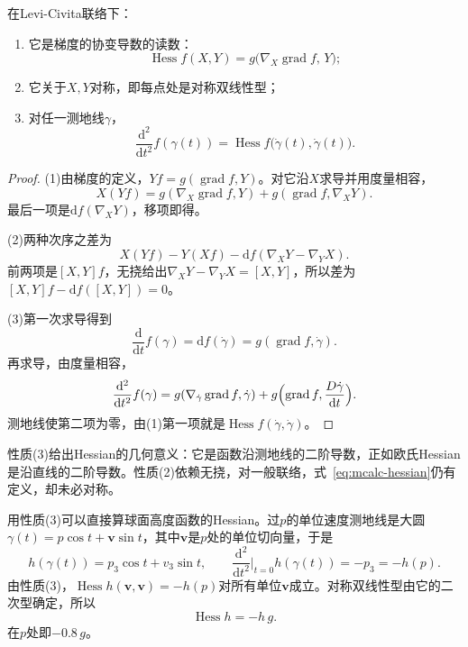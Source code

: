 \begin{theorem}[Hessian的性质]
\label{thm:mcalc-hessian-properties}
在Levi-Civita联络下：
\begin{enumerate}
\item 它是梯度的协变导数的读数：
\begin{equation}
\operatorname{Hess}f(X,Y)=g\bigl(\nabla_X\operatorname{grad}f,\,Y\bigr);
\label{eq:mcalc-hessian-grad}
\end{equation}
\item 它关于$X,Y$对称，即每点处是对称双线性型；
\item 对任一测地线$\gamma$，
\begin{equation}
\frac{\mathrm d^2}{\mathrm dt^2}f(\gamma(t))=\operatorname{Hess}f\bigl(\dot\gamma(t),\dot\gamma(t)\bigr).
\label{eq:mcalc-hessian-geodesic}
\end{equation}
\end{enumerate}
\end{theorem}

\begin{proof}
(1)由梯度的定义，$Yf=g(\operatorname{grad}f,Y)$。对它沿$X$求导并用度量相容，
\[
X(Yf)=g(\nabla_X\operatorname{grad}f,Y)+g(\operatorname{grad}f,\nabla_XY).
\]
最后一项是$\mathrm df(\nabla_XY)$，移项即得。

(2)两种次序之差为
\[
X(Yf)-Y(Xf)-\mathrm df(\nabla_XY-\nabla_YX).
\]
前两项是$[X,Y]f$，无挠给出$\nabla_XY-\nabla_YX=[X,Y]$，所以差为$[X,Y]f-\mathrm df([X,Y])=0$。

(3)第一次求导得到
\[
\frac{\mathrm d}{\mathrm dt}f(\gamma)=\mathrm df(\dot\gamma)=g(\operatorname{grad}f,\dot\gamma).
\]
再求导，由度量相容，
\[
\frac{\mathrm d^2}{\mathrm dt^2}f(\gamma)=g(\nabla_{\dot\gamma}\operatorname{grad}f,\dot\gamma)+g\Bigl(\operatorname{grad}f,\frac{D\dot\gamma}{\mathrm dt}\Bigr).
\]
测地线使第二项为零，由(1)第一项就是$\operatorname{Hess}f(\dot\gamma,\dot\gamma)$。
\end{proof}

性质(3)给出Hessian的几何意义：它是函数沿测地线的二阶导数，正如欧氏Hessian是沿直线的二阶导数。性质(2)依赖无挠，对一般联络，式~\eqref{eq:mcalc-hessian}仍有定义，却未必对称。

用性质(3)可以直接算球面高度函数的Hessian。过$p$的单位速度测地线是大圆$\gamma(t)=p\cos t+\bm v\sin t$，其中$\bm v$是$p$处的单位切向量，于是
\[
h(\gamma(t))=p_3\cos t+v_3\sin t,\qquad
\frac{\mathrm d^2}{\mathrm dt^2}\Big|_{t=0}h(\gamma(t))=-p_3=-h(p).
\]
由性质(3)，$\operatorname{Hess}h(\bm v,\bm v)=-h(p)$对所有单位$\bm v$成立。对称双线性型由它的二次型确定，所以
\[
\operatorname{Hess}h=-h\,g .
\]
在$p$处即$-0.8\,g$。

